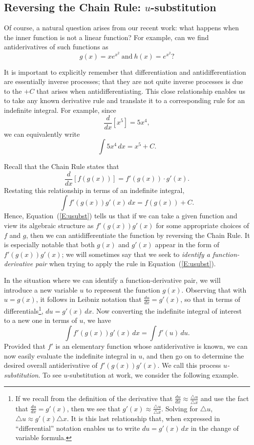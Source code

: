 

\subsection*{Reversing the Chain Rule: $u$-substitution} 

Of course, a natural question  arises from our recent work: what happens when the inner function is not a linear function?  For example, can we find antiderivatives of such functions as 
$$g(x) = x e^{x^2} \ \mbox{and} \ h(x) = e^{x^2}?$$

It is important to explicitly remember that differentiation and antidifferentiation are essentially inverse processes; that they are not quite inverse processes is due to the $+C$ that arises when antidifferentiating.  This close relationship enables us to take any known derivative rule and translate it to a corresponding rule for an indefinite integral.  For example, since
$$\frac{d}{dx} \left[x^5\right] = 5x^4,$$
we can equivalently write
$$\int 5x^4 \, dx = x^5 + C.$$

Recall that the Chain Rule states that
$$\frac{d}{dx} \left[ f(g(x)) \right] = f'(g(x)) \cdot g'(x).$$
Restating this relationship in terms of an indefinite integral,
\begin{equation} \label{E:usubst}
\int f'(g(x)) g'(x) \, dx = f(g(x))+C.
\end{equation}
Hence, Equation~(\ref{E:usubst}) tells us that if we can take a given function and view its algebraic structure as $f'(g(x)) g'(x)$ for some appropriate choices of $f$ and $g$, then we can antidifferentiate the function by reversing the Chain Rule.  It is especially notable that both $g(x)$ and $g'(x)$ appear in the form of $f'(g(x)) g'(x)$; we will sometimes say that we seek to \emph{identify a function-derivative pair} when trying to apply the rule in Equation~(\ref{E:usubst}).

In the situation where we can identify a function-derivative pair, we will introduce a new variable $u$ to represent the function $g(x)$.  Observing that with $u = g(x)$, it follows in Leibniz notation that $\frac{du}{dx} = g'(x)$, so that in terms of differentials\footnote{If we recall from the definition of the derivative that $\frac{du}{dx} \approx \frac{\triangle{u}}{\triangle{x}}$ and use the fact that $\frac{du}{dx} = g'(x)$, then we see that $g'(x) \approx \frac{\triangle{u}}{\triangle{x}}$.  Solving for $\triangle u$, $\triangle u \approx g'(x) \triangle x$.  It is this last relationship that, when expressed in ``differential'' notation enables us to write $du = g'(x) \, dx$ in the change of variable formula.}, $du = g'(x)\, dx$.  Now converting the indefinite integral of interest to a new one in terms of $u$, we have  
$$\int f'(g(x)) g'(x) \, dx = \int f'(u) \,du.$$
Provided that $f'$ is an elementary function whose antiderivative is known, we can now easily evaluate the indefinite integral in $u$, and then go on to determine the desired overall antiderivative of $f'(g(x)) g'(x)$.  We call this process \emph{$u$-substitution}.  To see $u$-substitution at work, we consider the following example.

